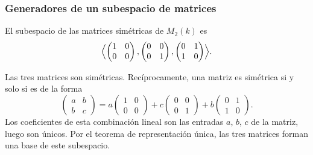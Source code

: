\begin{frame}
    \frametitle{Generadores de un subespacio de matrices}

    \begin{example}
        El subespacio de las matrices simétricas de $M_2(k)$ es
        \[
            \Bigl\langle
            \begin{pmatrix}1&0\\0&0\end{pmatrix},
            \begin{pmatrix}0&0\\0&1\end{pmatrix},
            \begin{pmatrix}0&1\\1&0\end{pmatrix}
            \Bigr\rangle.
        \]
    \end{example}

    \medskip

    Las tres matrices son simétricas. Recíprocamente, una matriz es simétrica
    si y solo si es de la forma
    \[
        \begin{pmatrix}a&b\\b&c\end{pmatrix}
        =a\begin{pmatrix}1&0\\0&0\end{pmatrix}
        +c\begin{pmatrix}0&0\\0&1\end{pmatrix}
        +b\begin{pmatrix}0&1\\1&0\end{pmatrix}.
    \]
    Los coeficientes de esta combinación lineal son las entradas $a$, $b$,
    $c$ de la matriz, luego son únicos. Por el teorema de representación
    única, las tres matrices forman una \alert{base} de este subespacio.
\end{frame}

